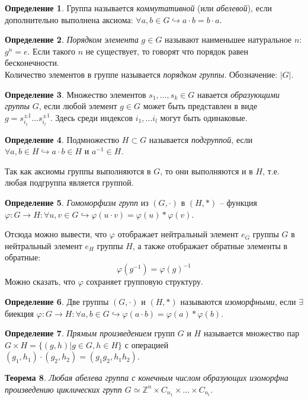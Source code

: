\documentclass[12pt]{article}
\newtheorem{theorem}{Теорема}
\theoremstyle{definition}
\newtheorem{defin}[theorem]{Определение}
\begin{document}
\begin{defin}
Группа называется \textit{коммутативной} (или \textit{абелевой}), если дополнительно выполнена аксиома: $\forall a,b\in G\hookrightarrow a\cdot b=b\cdot a$.
\end{defin}
\begin{defin}
\textit{Порядком элемента} $g\in G$ называют наименьшее натуральное $n$: $g^n=e$. Если такого $n$ не существует, то говорят что порядок равен бесконечности.\\
Количество элементов в группе называется \textit{порядком группы}. Обозначение: $|G|$.
\end{defin}
\begin{defin}
Множество элементов $s_1,...,s_k\in G$ навается \textit{образующими группы} $G$, если любой элемент $g\in G$ может быть представлен в виде $g=s^{\pm 1}_{i_1}...s^{\pm1}_{i_l}$. Здесь среди индексов $i_1,...i_l$ могут быть одинаковые.
\end{defin}
\begin{defin}
    Подмножество $H\subset G$ называется \textit{подгруппой}, если $\forall a,b\in H\hookrightarrow a\cdot b\in H$ и $a^{-1}\in H$.
\end{defin} 
Так как аксиомы группы выполняются в $G$, то они выполняются и в $H$, т.е. любая подгруппа является группой.
\begin{defin}
    \textit{Гомоморфизм групп} из $(G,\cdot)$ в $(H,*)$ -- функция $\varphi:G\rightarrow H:\forall u,v\in G\hookrightarrow \varphi(u\cdot v)=\varphi(u)*\varphi(v)$. 
\end{defin}
Отсюда можно вывести, что $\varphi$ отображает нейтральный элемент $e_G$ группы $G$ в нейтральный элемент $e_H$ группы $H$, а также отображает обратные элементы в обратные:
\begin{equation}
    \varphi(g^{-1})=\varphi(g)^{-1}
\end{equation}
Можно сказать, что $\varphi$ сохраняет групповую структуру.
\begin{defin}
    Две группы $(G,\cdot)$ и $(H,*)$ называются \textit{изоморфными}, если $\exists$ биекция $\varphi:G\rightarrow H:\forall a,b\in G\hookrightarrow\varphi(a\cdot b)=\varphi(a)*\varphi(b)$.
\end{defin}
\begin{defin}
    \textit{Прямым произведением} групп $G$ и $H$ называется множество пар $G\times H=\{(g,h)|g\in G, h\in H\}$ с операцией $(g_1,h_1)\cdot(g_2,h_2)=(g_1g_2,h_1h_2)$.
\end{defin}
\begin{theorem}
    Любая абелева группа с конечным числом образующих изоморфна произведению циклических групп $G\simeq\mathbb{Z}^n\times C_{n_1}\times...\times C_{n_l}$.
\end{theorem}
\end{document}
